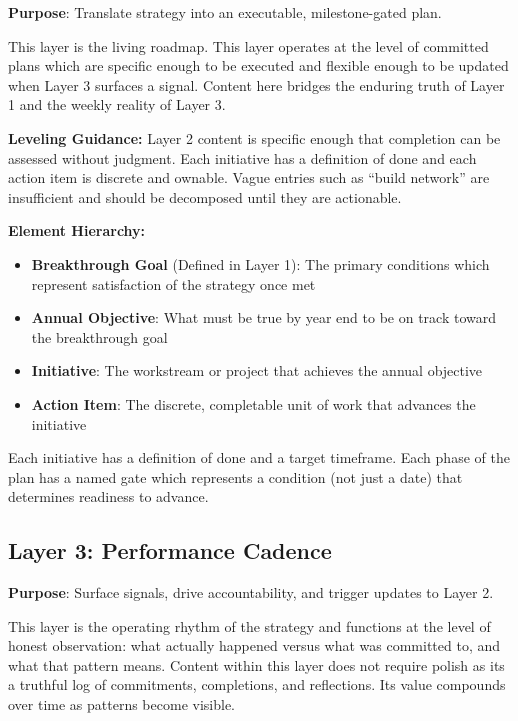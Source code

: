 \documentclass{article}
\begin{document}
\textbf{Purpose}: Translate strategy into an executable, milestone-gated plan.

This layer is the living roadmap. This layer operates at the level of committed plans which are specific enough 
to be executed and flexible enough to be updated when Layer 3 surfaces a signal. Content here bridges the enduring truth 
of Layer 1 and the weekly reality of Layer 3. 

\textbf{Leveling Guidance:} Layer 2 content is specific enough that completion can be assessed without judgment.
Each initiative has a definition of done and each action item is discrete and ownable. Vague entries such as 
``build network'' are insufficient and should be decomposed until they are actionable.

\textbf{Element Hierarchy:}

\begin{itemize}
	\item \textbf{Breakthrough Goal} (Defined in Layer 1): The primary conditions which represent satisfaction of the strategy once met
	\item \textbf{Annual Objective}: What must be true by year end to be on track toward the breakthrough goal
	\item \textbf{Initiative}: The workstream or project that achieves the annual objective
	\item \textbf{Action Item}: The discrete, completable unit of work that advances the initiative
\end{itemize}

Each initiative has a definition of done and a target timeframe. Each phase of the plan has a named gate which
represents a condition (not just a date) that determines readiness to advance.

\subsection{Layer 3: Performance Cadence}

\textbf{Purpose}: Surface signals, drive accountability, and trigger updates to Layer 2.

This layer is the operating rhythm of the strategy and functions at the level of honest observation: what actually happened 
versus what was committed to, and what that pattern means. Content within this layer does not require polish as its a truthful 
log of commitments, completions, and reflections. Its value compounds over time as patterns become visible.
\end{document}
